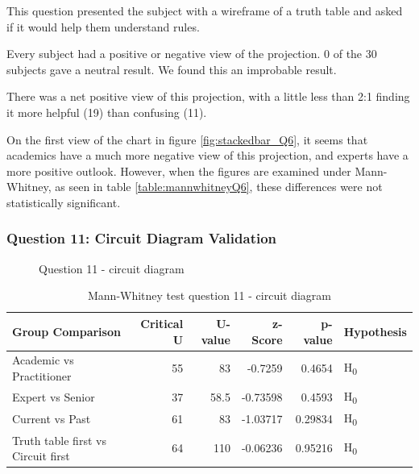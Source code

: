 This question presented the subject with a wireframe of a truth table and asked if it would help them understand rules.

Every subject had a positive or negative view of the projection.
0 of the 30 subjects gave a neutral result.
We found this an improbable result.

There was a net positive view of this projection, with a little less than 2:1 finding it more helpful (19) than confusing (11).

On the first view of the chart in figure \ref{fig:stackedbar_Q6}, it seems that academics have a much more negative view of this projection, and experts have a more positive outlook.
However, when the figures are examined under Mann-Whitney, as seen in table \ref{table:mannwhitneyQ6}, these differences were not statistically significant.

\subsubsection{Question 11: Circuit Diagram Validation}

\begin{figure}[H]
    \centering
    \caption{Question 11 - circuit diagram}
    \label{fig:stackedbar_Q7}
\end{figure}

\begin{table}[H]
    \begin{center}
        \begin{tabular}{ |l ||r |r |r | r|l | } 
            \hline
            Group Comparison                   & Critical U & U-value & z-Score  & p-value & Hypothesis         \\
            \hline
            \hline
            Academic vs Practitioner           & 55         & 83      & -0.7259  & 0.4654  & H\textsubscript{0} \\ 
            \hline
            Expert vs Senior                   & 37         & 58.5    & -0.73598 & 0.4593  & H\textsubscript{0} \\ 
            \hline
            Current vs Past                    & 61         & 83      & -1.03717 & 0.29834 & H\textsubscript{0} \\ 
            \hline
            Truth table first vs Circuit first & 64         & 110     & -0.06236 & 0.95216 & H\textsubscript{0} \\ 
            \hline
        \end{tabular}
    \end{center}
    \caption{Mann-Whitney test question 11 - circuit diagram}
    \label{table:mannwhitneyQ7}
\end{table}


